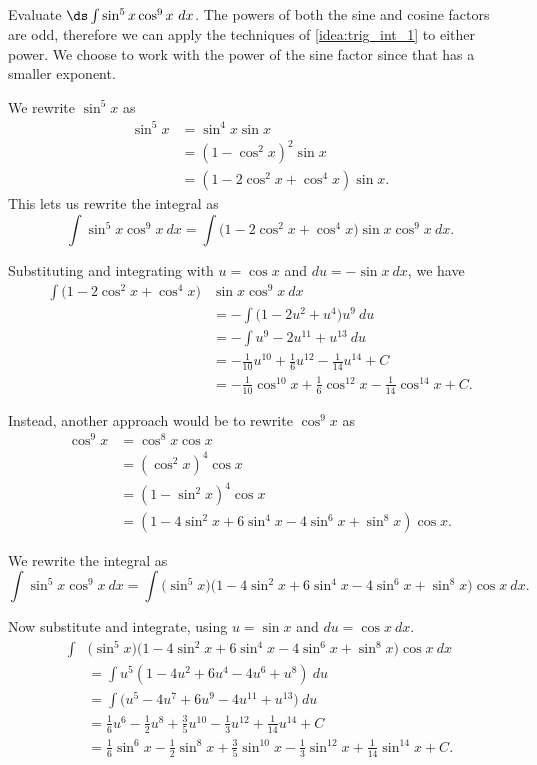 \begin{example}\label{ex_trigint2}
Evaluate $\ds \int\sin^5x\cos^9x\ dx$.
\solution
The powers of both the sine and cosine factors are odd, therefore we can apply the techniques of \autoref{idea:trig_int_1} to either power.
We choose to work with the power of the sine factor since that has a smaller exponent.

We rewrite $\sin^5x$ as
\begin{align*}
 \sin^5x&=\sin^4x\sin x\\
 &=(1-\cos^2x)^2\sin x\\
 &=(1-2\cos^2x+\cos^4x)\sin x.
\end{align*}
This lets us rewrite the integral as
\[
\int\sin^5x\cos^9x\ dx=\int\bigl(1-2\cos^2x+\cos^4x\bigr)\sin x\cos^9x\ dx.
\]

Substituting and integrating with $u=\cos x$ and $du=-\sin x\ dx$, we have
\begin{align*}
\int\bigl(1-2\cos^2x+\cos^4x\bigr)&\sin x\cos^9x\ dx\\
&=-\int\bigl(1-2u^2+u^4\bigr)u^9\ du\\
&=-\int u^9-2u^{11}+u^{13}\ du\\
&=-\frac1{10}u^{10}+\frac16u^{12}-\frac1{14}u^{14}+C\\
&=-\frac1{10}\cos^{10}x+\frac16\cos^{12}x-\frac1{14}\cos^{14}x+C.
\end{align*}

Instead, another approach would be to rewrite $\cos^9x$ as
\begin{align*} \cos^9 x &= \cos^8x\cos x \\
				&= (\cos^2x)^4\cos x \\
				&= (1-\sin^2x)^4\cos x \\
				&= (1-4\sin^2x+6\sin^4x-4\sin^6x+\sin^8x)\cos x.
\end{align*}

We rewrite the integral as 
\[\int\sin^5x\cos^9x\ dx = \int\bigl(\sin^5x\bigr)\bigl(1-4\sin^2x+6\sin^4x-4\sin^6x+\sin^8x\bigr)\cos x\ dx.\]

Now substitute and integrate, using $u = \sin x $ and $du = \cos x\ dx$.
\begin{align*}
 \int & \bigl(\sin^5x\bigr)\bigl(1-4\sin^2x+6\sin^4x-4\sin^6x+\sin^8x\bigr)\cos x\ dx \\
 &=\int u^5(1-4u^2+6u^4-4u^6+u^8)\ du \\
 &= \int\bigl(u^5-4u^7+6u^9-4u^{11}+u^{13}\bigr)\ du \\
 &= \frac16u^6-\frac12u^8+\frac35u^{10}-\frac13u^{12}+\frac{1}{14}u^{14}+C\\
 &= \frac16\sin^6 x-\frac12\sin^8 x+\frac35\sin^{10} x-\frac13\sin^{12} x+\frac{1}{14}\sin^{14} x+C.
\end{align*}
%
\end{example}

